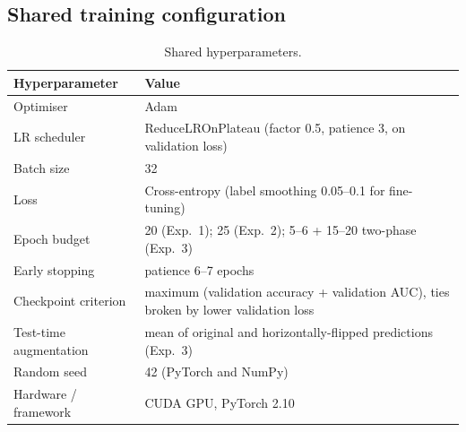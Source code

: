\documentclass[11pt,a4paper]{article}
\numberwithin{figure}{section}
\numberwithin{table}{section}
\begin{document}
\subsection{Shared training configuration}
\begin{table}[H]
\centering
\caption{Shared hyperparameters.}
\label{tab:hyper}
\begin{tabularx}{\textwidth}{lX}
\toprule
Hyperparameter & Value \\
\midrule
Optimiser & Adam \\
LR scheduler & ReduceLROnPlateau (factor 0.5, patience 3, on validation loss) \\
Batch size & 32 \\
Loss & Cross-entropy (label smoothing 0.05--0.1 for fine-tuning) \\
Epoch budget & 20 (Exp.\ 1); 25 (Exp.\ 2); 5--6 + 15--20 two-phase (Exp.\ 3) \\
Early stopping & patience 6--7 epochs \\
Checkpoint criterion & maximum (validation accuracy + validation AUC), ties broken by lower validation loss \\
Test-time augmentation & mean of original and horizontally-flipped predictions (Exp.\ 3) \\
Random seed & 42 (PyTorch and NumPy) \\
Hardware / framework & CUDA GPU, PyTorch 2.10 \cite{pytorch} \\
\bottomrule
\end{tabularx}
\end{table}
\end{document}
